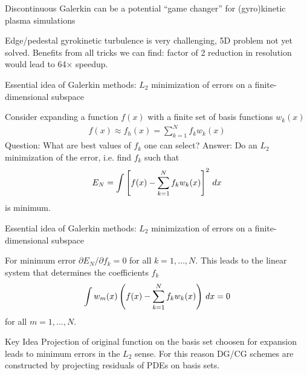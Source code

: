 \documentclass[pdf]{beamer}
\newcommand{\mypause}{}
\theoremstyle{definition}
\begin{document}
\begin{frame}{Discontinuous Galerkin can be a potential ``game
    changer'' for (gyro)kinetic plasma simulations}
  
  Edge/pedestal gyrokinetic turbulence is very challenging, 5D problem
  not yet solved. Benefits from all tricks we can find: factor of 2
  reduction in resolution would lead to 64$\times$ speedup.

\end{frame}

\begin{frame}{Essential idea of Galerkin methods: $L_2$ minimization
    of errors on a finite-dimensional subspace}

  Consider expanding a function $f(x)$ with a finite set of basis
  functions $w_k(x)$
  \begin{align*}
    f(x) \approx f_h(x)  = \sum_{k=1}^N f_k w_k(x)
  \end{align*}
  Question: What are best values of $f_k$ one can select?  \mypause
  Answer: Do an $L_2$ minimization of the error, i.e. find $f_k$ such
  that
  \begin{align*}
    E_N = \int \left[
      f(x) - \sum_{k=1}^N f_k w_k(x)\right]^2\thinspace dx
  \end{align*}
  is minimum.

\end{frame}

\begin{frame}{Essential idea of Galerkin methods: $L_2$ minimization
    of errors on a finite-dimensional subspace}

  For minimum error $\partial E_N/\partial f_k = 0$ for all
  $k=1,\ldots,N$. This leads to the linear system that determines the
  coefficients $f_k$
  \begin{align*}
    \int w_m(x) \left(
      f(x) - \sum_{k=1}^N f_k w_k(x)
    \right)\thinspace dx = 0
  \end{align*}
  for all $m=1,\ldots,N$.
  \mypause
  \begin{block}{Key Idea}
    Projection of original function on the basis set choosen for
    expansion leads to minimum errors in the $L_2$ sense. For this
    reason DG/CG schemes are constructed by projecting residuals of
    PDEs on basis sets.
  \end{block}

\end{frame}
\end{document}
